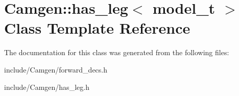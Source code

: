 \hypertarget{a00260}{\section{Camgen\-:\-:has\-\_\-leg$<$ model\-\_\-t $>$ Class Template Reference}
\label{a00260}
}


The documentation for this class was generated from the following files\-:\begin{DoxyCompactItemize}
\item 
include/\-Camgen/forward\-\_\-decs.\-h\item 
include/\-Camgen/has\-\_\-leg.\-h\end{DoxyCompactItemize}
